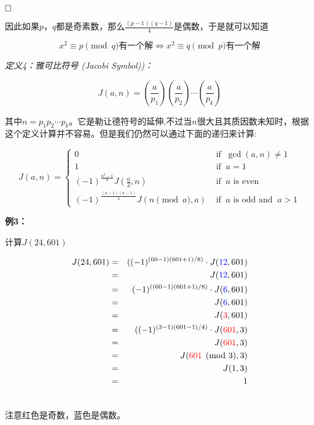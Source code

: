 \documentclass{article}
\begin{document}
$\hfill\square$ 



因此如果$p，q$都是奇素数，那么$\frac{(p-1)(q-1)}{4}$是偶数，于是就可以知道

$$x^2 \equiv p \pmod{q} \mbox{有一个解} \Leftrightarrow	x^2 \equiv q \pmod{p} \mbox{有一个解}$$


\textit{定义4：雅可比符号 (Jacobi Symbol))：}


$$J(a,n) = \left(\frac{a}{p_1}\right)\left(\frac{a}{p_2}\right) \cdots \left(\frac{a}{p_k}\right)$$

其中$n = p_1p_2 \cdots p_k$。它是勒让德符号的延伸,不过当$n$很大且其质因数未知时，根据这个定义计算并不容易。但是我们仍然可以通过下面的递归来计算:


$$
J(a, n)=\left\{\begin{array}{ll}
0 & \text { if } \ \operatorname{gcd}(a, n) \neq 1 \\
1 & \text { if } \ a=1 \\
(-1)^{\frac{n^{2}-1}{8}} J\left(\frac{a}{2}, n\right) & \text { if } \ a \text { \ is \ even } \\
(-1)^{\frac{(a-1)(n-1)}{4}} J(n\pmod{a}, a) & \text { if } \ a \text { \ is \ odd \ and } \ a>1
\end{array}\right.
$$

\textbf{例3：}

计算$J(24,601)$

\begin{eqnarray}   
\label{eq}
J(24,601) &=& ((-1)^{(60-1)(601+1)/8)} \cdot J({\color{blue}12},601) \nonumber \\
&=&  J({\color{blue}12},601) \nonumber \\
&=& (-1)^{((60-1)(601+1)/8)} \cdot J({\color{blue}6},601) \nonumber \\ 
&=&  J({\color{blue}6},601) \nonumber \\
&=& J({\color{red}3},601) \nonumber \\
&=& ((-1)^{(3-1)(601-1)/4)} \cdot  J({\color{red}601},3) \nonumber \\
&=& J({\color{red}601},3) \nonumber \\
&=& J({\color{red}601} \pmod{3}, 3) \nonumber \\
&=& J(1, 3) \nonumber \\
&=& 1 \nonumber \\
\nonumber 
\end{eqnarray}

注意{\color{red}红色}是奇数，{\color{blue}蓝色}是偶数。
\end{document}
